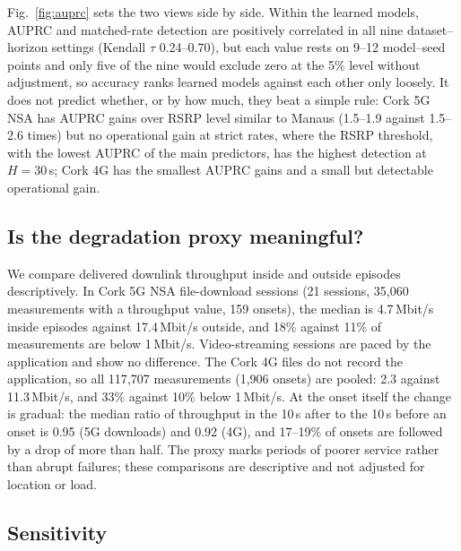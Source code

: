 \documentclass[preprint,review,12pt]{elsarticle}
\begin{document}
Fig.~\ref{fig:auprc} sets the two views side by side. Within the learned models, AUPRC
and matched-rate detection are positively correlated in all nine dataset--horizon
settings (Kendall $\tau$ 0.24--0.70), but each value rests on 9--12 model--seed points
and only five of the nine would exclude zero at the 5\% level without adjustment, so
accuracy ranks learned models against each other only loosely. It does not predict whether, or by how much, they beat a simple
rule: Cork 5G NSA has AUPRC gains over RSRP level similar to Manaus (1.5--1.9 against
1.5--2.6 times) but no operational gain at strict rates, where the RSRP threshold, with
the lowest AUPRC of the main predictors, has the highest detection at $H=30$\,s;
Cork 4G has the smallest AUPRC gains and a small but detectable operational gain.

\subsection{Is the degradation proxy meaningful?}
\label{sec:proxy}
We compare delivered downlink throughput inside and outside episodes descriptively.
In Cork 5G NSA file-download sessions (21 sessions, 35{,}060 measurements with a
throughput value, 159 onsets), the median is 4.7\,Mbit/s inside episodes against
17.4\,Mbit/s outside, and 18\% against 11\% of measurements are below 1\,Mbit/s.
Video-streaming sessions are paced by the application and show no difference. The
Cork 4G files do not record the application, so all 117{,}707 measurements (1{,}906
onsets) are pooled: 2.3 against 11.3\,Mbit/s, and 33\% against 10\% below 1\,Mbit/s.
At the onset itself the change is gradual: the median ratio of throughput in the
10\,s after to the 10\,s before an onset is 0.95 (5G downloads) and 0.92 (4G), and
17--19\% of onsets are followed by a drop of more than half. The proxy marks periods
of poorer service rather than abrupt failures; these comparisons are descriptive and
not adjusted for location or load.

\subsection{Sensitivity}
\label{sec:sens}
\end{document}

